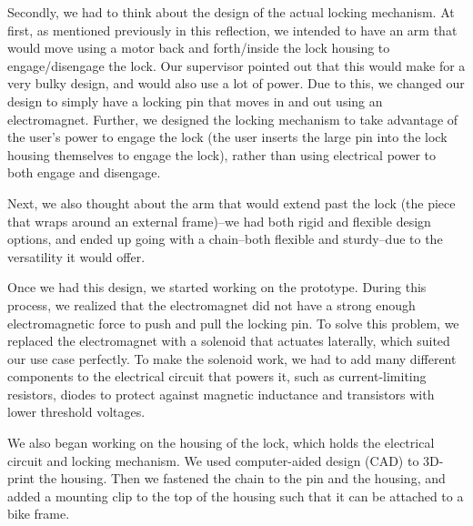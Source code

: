 \documentclass{article}
\begin{document}
Secondly, we had to think about the design of the actual locking mechanism. At first, as mentioned previously in this reflection, we intended to have an arm that would move using a motor back and forth/inside the lock housing to engage/disengage the lock. Our supervisor pointed out that this would make for a very bulky design, and would also use a lot of power. Due to this, we changed our design to simply have a locking pin that moves in and out using an electromagnet. Further, we designed the locking mechanism to take advantage of the user's power to engage the lock (the user inserts the large pin into the lock housing themselves to engage the lock), rather than using electrical power to both engage and disengage.

Next, we also thought about the arm that would extend past the lock (the piece that wraps around an external frame)--we had both rigid and flexible design options, and ended up going with a chain--both flexible and sturdy--due to the versatility it would offer. 

Once we had this design, we started working on the prototype. During this process, we realized that the electromagnet did not have a strong enough electromagnetic force to push and pull the locking pin. To solve this problem, we replaced the electromagnet with a solenoid that actuates laterally, which suited our use case perfectly. To make the solenoid work, we had to add many different components to the electrical circuit that powers it, such as current-limiting resistors, diodes to protect against magnetic inductance and transistors with lower threshold voltages. 

We also began working on the housing of the lock, which holds the electrical circuit and locking mechanism. We used computer-aided design (CAD) to 3D-print the housing. Then we fastened the chain to the pin and the housing, and added a mounting clip to the top of the housing such that it can be attached to a bike frame. 
\end{document}
